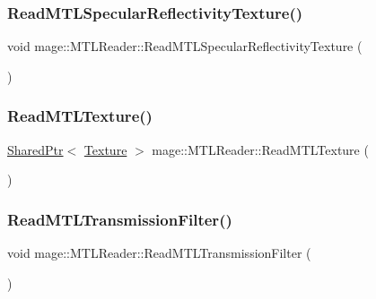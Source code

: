 \hypertarget{classmage_1_1_m_t_l_reader_abb56329a3642b377b006bca6cee60440}{}\label{classmage_1_1_m_t_l_reader_abb56329a3642b377b006bca6cee60440} 
\subsubsection{\texorpdfstring{Read\+M\+T\+L\+Specular\+Reflectivity\+Texture()}{ReadMTLSpecularReflectivityTexture()}}
{\footnotesize\ttfamily void mage\+::\+M\+T\+L\+Reader\+::\+Read\+M\+T\+L\+Specular\+Reflectivity\+Texture (\begin{DoxyParamCaption}{ }\end{DoxyParamCaption})\hspace{0.3cm}{\ttfamily [private]}}

\hypertarget{classmage_1_1_m_t_l_reader_a7ff401dab1b58709debff6cbe2c02d0c}{}\label{classmage_1_1_m_t_l_reader_a7ff401dab1b58709debff6cbe2c02d0c} 
\subsubsection{\texorpdfstring{Read\+M\+T\+L\+Texture()}{ReadMTLTexture()}}
{\footnotesize\ttfamily \hyperlink{namespacemage_a1e01ae66713838a7a67d30e44c67703e}{Shared\+Ptr}$<$ \hyperlink{classmage_1_1_texture}{Texture} $>$ mage\+::\+M\+T\+L\+Reader\+::\+Read\+M\+T\+L\+Texture (\begin{DoxyParamCaption}{ }\end{DoxyParamCaption})\hspace{0.3cm}{\ttfamily [private]}}

\hypertarget{classmage_1_1_m_t_l_reader_a4d5819606b5ea81862852587b2e1511b}{}\label{classmage_1_1_m_t_l_reader_a4d5819606b5ea81862852587b2e1511b} 
\subsubsection{\texorpdfstring{Read\+M\+T\+L\+Transmission\+Filter()}{ReadMTLTransmissionFilter()}}
{\footnotesize\ttfamily void mage\+::\+M\+T\+L\+Reader\+::\+Read\+M\+T\+L\+Transmission\+Filter (\begin{DoxyParamCaption}{ }\end{DoxyParamCaption})\hspace{0.3cm}{\ttfamily [private]}}



